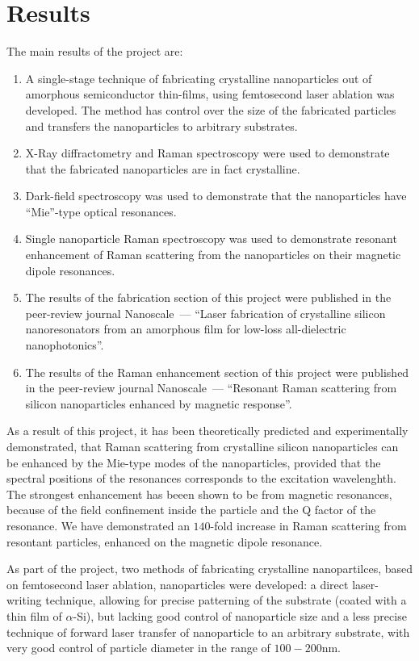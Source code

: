 \section*{Results}
    The main results of the project are:
    \begin{enumerate}
        \item A single-stage technique of fabricating crystalline nanoparticles out of amorphous
            semiconductor thin-films, using femtosecond laser ablation was developed. The method
            has control over the size of the fabricated particles and transfers the nanoparticles
            to arbitrary substrates.
        \item X-Ray diffractometry and Raman spectroscopy were used to demonstrate that the
            fabricated nanoparticles are in fact crystalline.
        \item Dark-field spectroscopy was used to demonstrate that the nanoparticles have
            ``Mie''-type optical resonances.
        \item Single nanoparticle Raman spectroscopy was used to demonstrate resonant enhancement of Raman scattering
            from the nanoparticles on their magnetic dipole resonances.
        \item The results of the fabrication section of this project were published in the peer-review
            journal Nanoscale~--- ``Laser fabrication of
            crystalline silicon nanoresonators from an amorphous film for low-loss all-dielectric nanophotonics''\cite{dmitriev2016laser}.
        \item The results of the Raman enhancement section of this project were published in the peer-review
            journal Nanoscale~--- ``Resonant Raman scattering from silicon nanoparticles
            enhanced by magnetic response''\cite{dmitriev2016resonant}.
    \end{enumerate}

    As a result of this project, it has been theoretically predicted and experimentally demonstrated, that Raman scattering
    from crystalline silicon nanoparticles can be enhanced by the Mie-type modes of the nanoparticles, provided that the
    spectral positions of the resonances corresponds to the excitation wavelenghth. The strongest enhancement has beeen shown
    to be from magnetic resonances, because of the field confinement inside the particle and the Q factor of the resonance.
    We have demonstrated an $140$-fold increase in Raman scattering from resontant particles, enhanced on the magnetic dipole
    resonance.

    As part of the project, two methods of fabricating crystalline nanopartilces, based on femtosecond laser ablation,
    nanoparticles were developed: a direct laser-writing technique, allowing for precise patterning of the substrate
    (coated with a thin film of $\alpha$-Si), but lacking good control of nanoparticle size and a less precise technique
    of forward laser transfer of nanoparticle to an arbitrary substrate, with very good control of particle diameter in the
    range of $100-200$nm.

\clearpage
